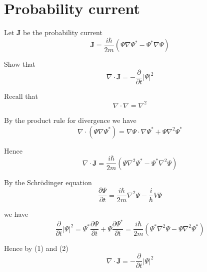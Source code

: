 

\section*{Probability current}

Let $\mathbf J$ be the probability current
\begin{equation*}
\mathbf J=\frac{i\hbar}{2m}\left(\Psi\nabla\Psi^*-\Psi^*\nabla\Psi\right)
\end{equation*}

Show that
\begin{equation*}
\nabla\cdot\mathbf J=-\frac{\partial}{\partial t}|\Psi|^2
\end{equation*}

Recall that
\begin{equation*}
\nabla\cdot\nabla=\nabla^2
\end{equation*}

By the product rule for divergence we have
\begin{equation*}
\nabla\cdot(\Psi\nabla\Psi^*)
=\nabla\Psi\cdot\nabla\Psi^*+\Psi\nabla^2\Psi^*
\end{equation*}

Hence
\begin{equation*}
\nabla\cdot\mathbf J
=\frac{i\hbar}{2m}\left(\Psi\nabla^2\Psi^*-\Psi^*\nabla^2\Psi\right)
\tag{1}
\end{equation*}

By the Schr\"odinger equation
\begin{equation*}
\frac{\partial\Psi}{\partial t}
=\frac{i\hbar}{2m}\nabla^2\Psi-\frac{i}{\hbar}V\Psi
\end{equation*}

we have
\begin{equation*}
\frac{\partial}{\partial t}|\Psi|^2
=\Psi^*\frac{\partial\Psi}{\partial t}+\Psi\frac{\partial\Psi^*}{\partial t}
=\frac{i\hbar}{2m}\left(\Psi^*\nabla^2\Psi-\Psi\nabla^2\Psi^*\right)
\tag{2}
\end{equation*}

Hence by (1) and (2)
\begin{equation*}
\nabla\cdot\mathbf J=-\frac{\partial}{\partial t}|\Psi|^2
\end{equation*}


